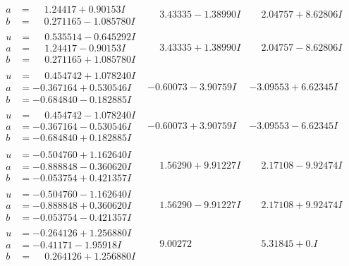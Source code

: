 \documentclass[1p]{elsarticle_modified}
\theoremstyle{definition}
\begin{document}
$$\begin{array}{c|c|c}
\begin{aligned}
a &= \phantom{-}1.24417 + 0.90153 I \\
b &= \phantom{-}0.271165 - 1.085780 I\end{aligned}
 & \phantom{-}3.43335 - 1.38990 I & \phantom{-}2.04757 + 8.62806 I \\ \hline\begin{aligned}
u &= \phantom{-}0.535514 - 0.645292 I \\
a &= \phantom{-}1.24417 - 0.90153 I \\
b &= \phantom{-}0.271165 + 1.085780 I\end{aligned}
 & \phantom{-}3.43335 + 1.38990 I & \phantom{-}2.04757 - 8.62806 I \\ \hline\begin{aligned}
u &= \phantom{-}0.454742 + 1.078240 I \\
a &= -0.367164 + 0.530546 I \\
b &= -0.684840 - 0.182885 I\end{aligned}
 & -0.60073 - 3.90759 I & -3.09553 + 6.62345 I \\ \hline\begin{aligned}
u &= \phantom{-}0.454742 - 1.078240 I \\
a &= -0.367164 - 0.530546 I \\
b &= -0.684840 + 0.182885 I\end{aligned}
 & -0.60073 + 3.90759 I & -3.09553 - 6.62345 I \\ \hline\begin{aligned}
u &= -0.504760 + 1.162640 I \\
a &= -0.888848 - 0.360620 I \\
b &= -0.053754 + 0.421357 I\end{aligned}
 & \phantom{-}1.56290 + 9.91227 I & \phantom{-}2.17108 - 9.92474 I \\ \hline\begin{aligned}
u &= -0.504760 - 1.162640 I \\
a &= -0.888848 + 0.360620 I \\
b &= -0.053754 - 0.421357 I\end{aligned}
 & \phantom{-}1.56290 - 9.91227 I & \phantom{-}2.17108 + 9.92474 I \\ \hline\begin{aligned}
u &= -0.264126 + 1.256880 I \\
a &= -0.41171 - 1.95918 I \\
b &= \phantom{-}0.264126 + 1.256880 I\end{aligned}
 & \phantom{-}9.00272\phantom{ +0.000000I} & \phantom{-}5.31845 + 0. I\phantom{ +0.000000I} \\ \hline\begin{aligned}

\end{aligned}
\end{array}$$
\end{document}
